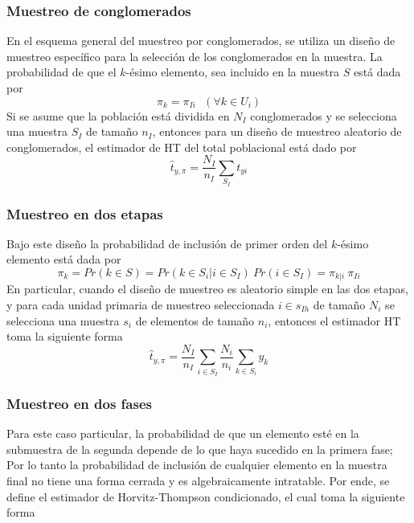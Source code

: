 \documentclass[
  10pt,
  spanish,
]{book}
\begin{document}
\hypertarget{muestreo-de-conglomerados-1}{%
\subsubsection*{Muestreo de conglomerados}\label{muestreo-de-conglomerados-1}}

En el esquema general del muestreo por conglomerados, se utiliza un diseño de muestreo específico para la selección de los conglomerados en la muestra. La probabilidad de que el \(k\)-ésimo elemento, sea incluido en la muestra \(S\) está dada por
\[
\pi_{k}=\pi_{Ii}  \ \ \ (\forall k \in U_i)
\]
Si se asume que la población está dividida en \(N_I\) conglomerados y se selecciona una muestra \(S_I\) de tamaño \(n_I\), entonces para un diseño de muestreo aleatorio de conglomerados, el estimador de HT del total poblacional está dado por
\[
\hat{t}_{y,\pi}=\frac{N_I}{n_I}\sum_{S_I}t_{yi}
\]

\hypertarget{muestreo-en-dos-etapas}{%
\subsubsection*{Muestreo en dos etapas}\label{muestreo-en-dos-etapas}}

Bajo este diseño la probabilidad de inclusión de primer orden del \(k\)-ésimo elemento está dada por
\[
\pi_{k}=Pr(k\in S)=Pr(k\in S_i|i\in S_I)\ Pr(i\in S_I)=\pi_{k|i}\ \pi_{Ii}
\]
En particular, cuando el diseño de muestreo es aleatorio simple en las dos etapas, y para cada unidad primaria de muestreo seleccionada \(i\in s_{Ih}\) de tamaño \(N_i\) se selecciona una muestra \(s_i\) de elementos de tamaño \(n_i\), entonces el estimador HT toma la siguiente forma
\[
\hat{t}_{y,\pi}=\frac{N_{I}}{n_{I}}\sum_{i\in S_{I}}\frac{N_i}{n_i}\sum_{k\in S_i}y_k
\]

\hypertarget{muestreo-en-dos-fases-1}{%
\subsubsection*{Muestreo en dos fases}\label{muestreo-en-dos-fases-1}}

Para este caso particular, la probabilidad de que un elemento esté en la submuestra de la segunda depende de lo que haya sucedido en la primera fase; Por lo tanto la probabilidad de inclusión de cualquier elemento en la muestra final no tiene una forma cerrada y es algebraicamente intratable. Por ende, se define el estimador de Horvitz-Thompson condicionado, el cual toma la siguiente forma
\end{document}
